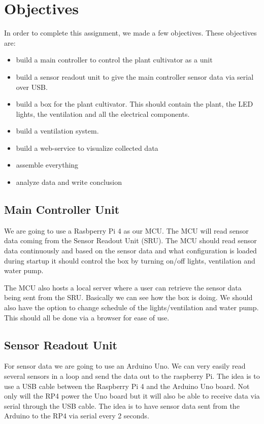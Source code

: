 \documentclass[12pt,a4paper,oneside]{book}
\begin{document}
\chapter{Objectives}
In order to complete this assignment, we made a few objectives.  These objectives are:

\begin{itemize}
\item build a main controller to control the plant cultivator as a unit
\item 
build a sensor readout unit to give the main controller sensor data via serial over USB.
\item 
build a box for the plant cultivator. This should contain the plant, the LED lights, the ventilation and all the electrical components.
\item 
build a ventilation system.
\item 
build a web-service to visualize collected data
\item 
assemble everything 
\item 
analyze data and write conclusion
\end{itemize}

\section{Main Controller Unit}
We are going to use a Rasbperry Pi 4 as our MCU. 
The MCU will read sensor data coming from the Sensor Readout Unit (SRU).
The MCU should read sensor data continuously and based on the sensor data and what configuration is loaded during startup it should control the box by turning on/off lights, ventilation and water pump.

The MCU also hosts a local server where a user can retrieve the sensor data being sent from the SRU. Basically we can see how the box is doing.
We should also have the option to change schedule of the lights/ventilation and water pump. This should all be done via a browser for ease of use.

\section{Sensor Readout Unit}
For sensor data we are going to use an Arduino Uno. We can very easily read several sensors in a loop and send the data out to the raspberry Pi. The idea is to use a USB cable between the Raspberry Pi 4 and the Arduino Uno board. Not only will the RP4 power the Uno board but it will also be able to receive data via serial through the USB cable. The idea is to have sensor data sent from the Arduino to the RP4 via serial every 2 seconds.
\end{document}
